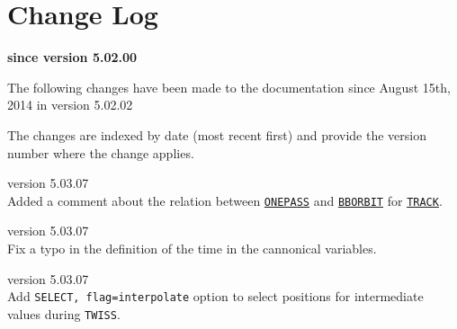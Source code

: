 \chapter*{Change Log}
\label{chap:changelog}

\begin{center} 
\textbf{since version 5.02.00}
\end{center}

The following changes have been made to the documentation since
August 15th, 2014 in version 5.02.02

The changes are indexed by date (most recent first) and provide the \madx 
version number where the change applies. 

\begin{madlist}
   version 5.03.07 \\
Added a comment about the relation between \hyperref[sec:track]{\texttt{ONEPASS}} and \hyperref[sec:option]{\texttt{BBORBIT}} for \hyperref[chap:thintrack]{\texttt{TRACK}}.

   version 5.03.07 \\
Fix a typo in the definition of the time in the cannonical variables.



   version 5.03.07 \\
  Add \texttt{SELECT, flag=interpolate} option to select positions for
  intermediate values during \texttt{TWISS}.





\end{madlist}
